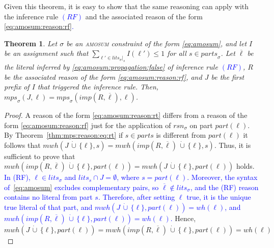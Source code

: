 \documentclass[preprint,authoryear]{elsarticle}
\newcommand{\lits}{\mathit{lits}}
\newcommand{\mwh}{\mathit{mwh}}
\newcommand{\wh}{\mathit{wh}}
\newcommand{\mps}{\mathit{mps}}
\newcommand{\parts}{\mathit{parts}}
\newcommand{\rsn}{\mathit{rsn}}
\newcommand{\cupdot}{\,\dot{\cup}\,}
\newtheorem{theorem}{Theorem}[section]
\theoremstyle{definition}
\begin{document}
Given this theorem, it is easy to show that the same reasoning can apply with the 
inference rule \textcolor{blue}{$(RF)$} and the associated reason of the form \textcolor{blue}{\eqref{eq:amosum:reason:rf}.}
\begin{theorem}
    \label{thm:mps:reason:eq:rf}
    Let $\sigma$ be an \textsc{amosum} constraint of the form \eqref{eq:amosum}, and let $I$ be an assignment such that $\sum_{\ell' \in \mathit{lits}_\sigma|_s}{I(\ell')} \leq 1$ for all $s \in \mathit{parts}_{\sigma} $. Let $\overline{\ell}$ be the literal inferred by \textcolor{blue}{\eqref{eq:amosum:propagation:false}} of inference rule \textcolor{blue}{$(RF)$}, $R$ be the associated reason of the form \eqref{eq:amosum:reason:rf}, and $J$ be the first prefix of $I$ that triggered the inference rule.
    Then, $\mps_\sigma(J,\ell)=\mps_\sigma(\mathit{imp}(R,\overline{\ell}),\ell)$. 
\end{theorem}
\begin{proof}
    A reason of the form \textcolor{blue}{\eqref{eq:amosum:reason:rt}} differs from a reason of the form \textcolor{blue}{\eqref{eq:amosum:reason:rf}} just for the application of $\rsn_\sigma$ on part $\mathit{part}(\ell)$.
    By Theorem~\ref{thm:mps:reason:eq:rt} if $s \in \parts$ is different from $\mathit{part}(\ell)$  it follows that
    $\mwh(J \cupdot \{\ell\}, s) = \mwh(\mathit{imp}(R,\overline{\ell}) \cupdot \{\ell\}, s)$.
    Thus, it is sufficient to prove that $\mwh(\mathit{imp}(R,\overline{\ell})\cupdot \{\ell\},\mathit{part}(\ell)) = \mwh(J \cupdot \{ {\ell} \},\mathit{part}(\ell))$ holds.
   \textcolor{blue}{In (RF), $\ell \in \lits_\sigma$ and $\lits_s \cap J = \emptyset$, where $s=\mathit{part}(\ell)$. Moreover, the syntax of~\eqref{eq:amosum} excludes complementary pairs, so $\overline{\ell}\notin\lits_\sigma$, and the (RF) reason contains no literal from part $s$. Therefore, after setting $\ell$ true, it is the unique true literal of that part, and
    $\mwh(J \cupdot \{ {\ell} \},\mathit{part}(\ell)) = \wh(\ell)$, and  $\mwh(\mathit{imp}(R,\overline{\ell}) \cupdot \{\ell\}, \mathit{part}(\ell))= \wh(\ell)$.}
    Hence, $\mwh(J \cupdot \{ {\ell} \},\mathit{part}(\ell)) = \mwh(\mathit{imp}(R,\overline{\ell})\cupdot \{\ell\}, \mathit{part}(\ell))= \wh(\ell)$
\end{proof}
\end{document}
